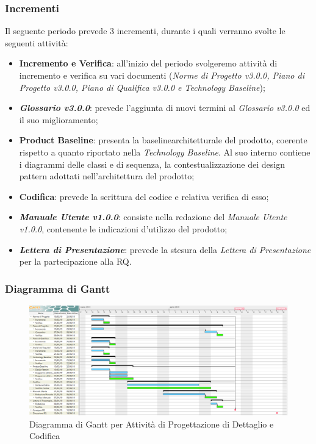 \subsubsection{Incrementi}
Il seguente periodo prevede 3 incrementi, durante i quali verranno svolte le seguenti attività:
\begin{itemize}
	\item \textbf{Incremento e Verifica}: all'inizio del periodo svolgeremo attività di incremento e verifica su vari documenti (\textit{Norme di Progetto v3.0.0, Piano di Progetto v3.0.0, Piano di Qualifica v3.0.0 e Technology Baseline});
	\item \textbf{\textit{Glossario v3.0.0}}: prevede l'aggiunta di nuovi termini al \textit{Glossario v3.0.0} ed il suo miglioramento;
	\item \textbf{Product Baseline}\glossario: presenta la baseline\glossario architetturale del prodotto, coerente rispetto a quanto riportato nella \textit{Technology Baseline}. Al suo interno contiene i diagrammi delle classi e di sequenza, la contestualizzazione dei design pattern adottati nell'architettura del prodotto; 
	\item \textbf{Codifica}: prevede la scrittura del codice e relativa verifica di esso;
	\item \textbf{\textit{Manuale Utente v1.0.0}}: consiste nella redazione del \textit{Manuale Utente v1.0.0}, contenente le indicazioni d'utilizzo del prodotto;
	\item \textbf{\textit{Lettera di Presentazione}}: prevede la stesura della \textit{Lettera di Presentazione} per la partecipazione alla RQ.
\end{itemize}


\begin{landscape}
\subsubsection{Diagramma di Gantt}
\begin{figure}[h]
	\centering
  		\includegraphics[width=1.0\linewidth]{./images/DettaglioeCodifica.png}
  		\caption{Diagramma di Gantt per Attività di Progettazione di Dettaglio e Codifica}
  		\label{fig:Gantt Progettazione di dettaglio e codifica}
\end{figure}
\end{landscape}

